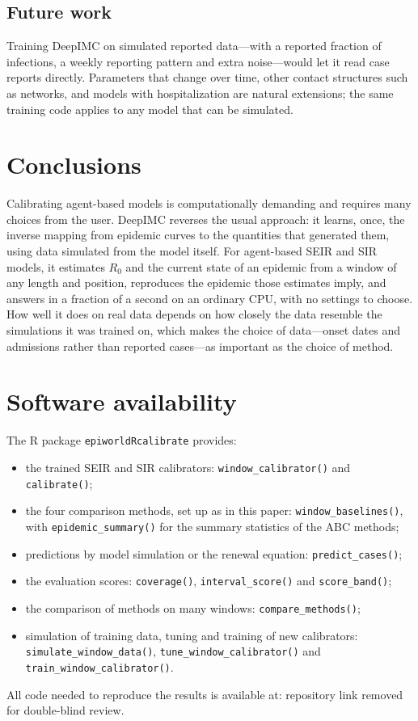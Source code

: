\documentclass[12pt]{article}
\begin{document}
\subsection{Future work}

Training DeepIMC on simulated reported data---with a reported fraction of infections, a weekly reporting
pattern and extra noise---would let it read case reports directly. Parameters that change over time,
other contact structures such as networks, and models with hospitalization are natural extensions; the
same training code applies to any model that can be simulated.

\section{Conclusions}

Calibrating agent-based models is computationally demanding and requires many choices from the user.
DeepIMC reverses the usual approach: it learns, once, the inverse mapping from epidemic curves to the
quantities that generated them, using data simulated from the model itself. For agent-based SEIR and SIR
models, it estimates $R_0$ and the current state of an epidemic from a window of any length and position,
reproduces the epidemic those estimates imply, and answers in a fraction of a second on an ordinary CPU,
with no settings to choose. How well it does on real data depends on how closely the data resemble the
simulations it was trained on, which makes the choice of data---onset dates and admissions rather than
reported cases---as important as the choice of method.

\section{Software availability}

The R package \texttt{epiworldRcalibrate} provides:
\begin{itemize}
\item the trained SEIR and SIR calibrators: \texttt{window\_calibrator()} and \texttt{calibrate()};
\item the four comparison methods, set up as in this paper: \texttt{window\_baselines()}, with
\texttt{epidemic\_summary()} for the summary statistics of the ABC methods;
\item predictions by model simulation or the renewal equation: \texttt{predict\_cases()};
\item the evaluation scores: \texttt{coverage()}, \texttt{interval\_score()} and \texttt{score\_band()};
\item the comparison of methods on many windows: \texttt{compare\_methods()};
\item simulation of training data, tuning and training of new calibrators:
  \texttt{simulate\_window\_data()}, \texttt{tune\_window\_calibrator()} and
  \texttt{train\_window\_calibrator()}.
\end{itemize}
All code needed to reproduce the results is available at: repository link removed for double-blind review.
\end{document}

